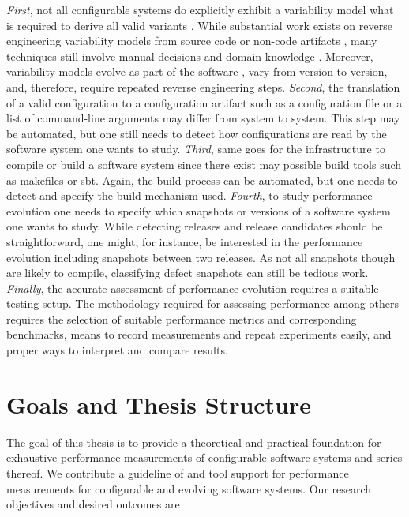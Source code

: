 \emph{First}, not all configurable systems do explicitly exhibit a variability
model what is required to derive all valid variants
\citep{rabkin_static_2011,nadi_where_2015}.
While substantial work exists on reverse engineering variability models from
source
\citep{rabkin_static_2011,she_reverse_2011,zhou_extracting_2015,nadi_where_2015}
code or non-code artifacts
\citep{alves_exploratory_2008,andersen_efficient_2012,bakar_feature_2015}, many
techniques still involve manual decisions \citep{she_reverse_2011} and domain
knowledge \citep{nadi_where_2015}.
Moreover, variability models evolve as part of the software
\citep{peng_analyzing_2011}, vary from version to version, and, therefore,
require repeated reverse engineering steps.
\emph{Second}, the translation of a valid configuration to a configuration
artifact such as a configuration file or a list of command-line arguments may differ
from system to system. This step may be automated, but one still needs to
detect how configurations are read by the software system one wants to study.
\emph{Third}, same goes for the infrastructure to compile or build a software
system since there exist may possible build tools such as makefiles or sbt.
Again, the build process can be automated, but one needs to detect and
specify the build mechanism used.
\emph{Fourth}, to study performance evolution one needs to specify which
snapshots or versions of a software system one wants to study. While detecting
releases and release candidates should be straightforward, one might, for
instance, be interested in the performance evolution including snapshots
between two releases. As not all snapshots though are likely to compile,
classifying defect snapshots can still be tedious work.
\emph{Finally}, the accurate assessment of performance evolution requires a
suitable testing setup. The methodology required for assessing performance
among others requires the selection of suitable performance metrics and
corresponding benchmarks, means to record measurements and repeat experiments
easily, and proper ways to interpret and compare results.

\section{Goals and Thesis Structure}

The goal of this thesis is to provide a theoretical and practical foundation for
exhaustive performance measurements of configurable software systems and series
thereof. We contribute a guideline of and tool support for performance
measurements for configurable and evolving software systems. Our research
objectives and desired outcomes are

